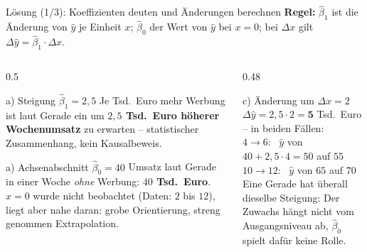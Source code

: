 \documentclass[aspectratio=169,11pt]{beamer}
\begin{document}
\begin{frame}{Lösung (1/3): Koeffizienten deuten und Änderungen berechnen}
  \small
  \textbf{Regel:} $\hat{\beta}_1$ ist die Änderung von $\hat{y}$ je Einheit $x$;
  $\hat{\beta}_0$ der Wert von $\hat{y}$ bei $x = 0$; bei $\Delta x$ gilt
  $\Delta \hat{y} = \hat{\beta}_1 \cdot \Delta x$.
  \medskip

  \begin{columns}[T]
    \begin{column}{0.5\textwidth}
      \begin{block}{a) Steigung $\hat{\beta}_1 = 2{,}5$}
        Je Tsd.\ Euro mehr Werbung ist laut Gerade ein um
        \textbf{$2{,}5$ Tsd.\ Euro höherer Wochenumsatz} zu erwarten --
        statistischer Zusammenhang, kein Kausalbeweis.
      \end{block}
      \begin{block}{a) Achsenabschnitt $\hat{\beta}_0 = 40$}
        Umsatz laut Gerade in einer Woche \emph{ohne} Werbung: \textbf{$40$ Tsd.\ Euro}.
        $x = 0$ wurde nicht beobachtet (Daten: $2$ bis $12$), liegt aber nahe daran:
        grobe Orientierung, streng genommen Extrapolation.
      \end{block}
    \end{column}
    \begin{column}{0.48\textwidth}
      \begin{exampleblock}{c) Änderung um $\Delta x = 2$}
        $\Delta \hat{y} = 2{,}5 \cdot 2 = \mathbf{5}$ Tsd.\ Euro -- in beiden Fällen:\\[2pt]
        $4 \to 6$: \ $\hat{y}$ von $40 + 2{,}5 \cdot 4 = 50$ auf $55$\\
        $10 \to 12$: \ $\hat{y}$ von $65$ auf $70$\\[2pt]
        Eine Gerade hat überall dieselbe Steigung: Der Zuwachs hängt nicht vom
        Ausgangsniveau ab, $\hat{\beta}_0$ spielt dafür keine Rolle.
      \end{exampleblock}
    \end{column}
  \end{columns}
\end{frame}
\end{document}
